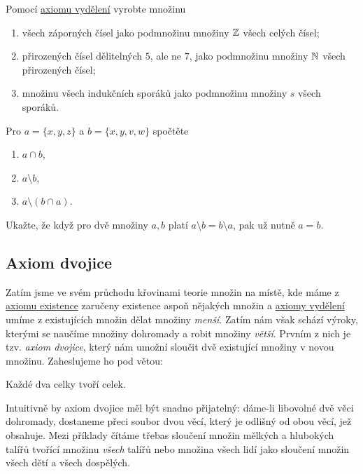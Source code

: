 \begin{exercise}
  Pomocí \hyperref[eq:axiom-vydeleni]{axiomu vydělení} vyrobte množinu
  \begin{enumerate}
    \item všech záporných čísel jako podmnožinu množiny $\mathbb{Z}$ všech celých
      čísel;
    \item přirozených čísel dělitelných $5$, ale ne $7$, jako podmnožinu množiny
      $\mathbb{N}$ všech přirozených čísel;
    \item množinu všech indukčních sporáků jako podmnožinu množiny $s$ všech
      sporáků.
  \end{enumerate}
\end{exercise}
\lessboxspace
\begin{exercise}
  Pro $a = \{x, y, z\}$ a $b = \{x, y, v, w\}$ spočtěte
  \begin{enumerate}
    \item $a \cap b$,
    \item $a \setminus b$,
    \item $a \setminus (b \cap a)$.
  \end{enumerate}
\end{exercise}
\lessboxspace
\begin{hardExercise}
  Ukažte, že když pro dvě množiny $a, b$ platí $a \setminus b = b \setminus a$,
  pak už nutně $a = b$.
\end{hardExercise}

\subsection{Axiom dvojice}
\label{ssec:axiom-dvojice}

Zatím jsme ve svém průchodu křovinami teorie množin na místě, kde máme z
\hyperref[ssec:axiom-existence]{axiomu existence} zaručeny existence aspoň
nějakých množin a \hyperref[ssec:axiomy-vydeleni]{axiomy vydělení} umíme z
existujících množin dělat množiny \emph{menší}. Zatím nám však schází výroky,
kterými se naučíme  množiny dohromady a robit množiny \emph{větší}.
Prvním z nich je tzv. \emph{axiom dvojice}, který nám umožní sloučit dvě
existující množiny v novou množinu. Zaheslujeme ho pod větou:
\begin{highlightBox}
  \alert{Každé dva celky tvoří celek.}
\end{highlightBox}
Intuitivně by axiom dvojice měl být snadno přijatelný: dáme-li libovolné dvě
věci dohromady, dostaneme přeci soubor dvou věcí, který je odlišný od obou věcí,
jež obsahuje. Mezi příklady čítáme třebas sloučení množin mělkých a hlubokých
talířů tvořící množinu \emph{všech} talířů nebo množina všech lidí jako sloučení
množin všech dětí a všech dospělých.

